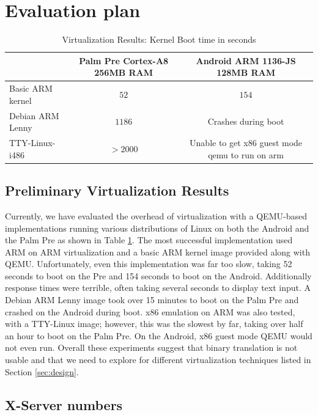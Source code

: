 \section{Evaluation plan}
\label{sec:eval}

\begin{table}[tbh]
\begin{tabular}{|l|c|c|}
\hline & Palm Pre Cortex-A8 256MB RAM & Android ARM 1136-JS 128MB RAM \\ 
\hline Basic ARM kernel & $52$ & $154$ \\ [2pt]
 Debian ARM Lenny & $1186$ & Crashes during boot \\ [2pt]
 TTY-Linux-i486 & $>2000$ & Unable to get x86 guest mode qemu to run on arm \\[2pt]
\hline 
\end{tabular}
\caption{
Virtualization Results: Kernel Boot time in seconds
}
\label{tab:virt_results}
\end{table}

\subsection{Preliminary Virtualization Results}

Currently, we have evaluated the overhead of virtualization with a QEMU-based implementations running various distributions of Linux on both the Android and the Palm Pre as shown in Table \ref{tab:virt_results}. The most successful implementation used ARM on ARM virtualization and a basic ARM kernel image provided along with QEMU. Unfortunately, even this implementation was far too slow, taking 52 seconds to boot on the Pre and 154 seconds to boot on the Android. Additionally response times were terrible, often taking several seconds to display text input. A Debian ARM Lenny image took over 15 minutes to boot on the Palm Pre and crashed on the Android during boot. x86 emulation on ARM was also tested, with a TTY-Linux image; however, this was the slowest by far, taking over half an hour to boot on the Palm Pre. On the Android, x86 guest mode QEMU would not even run. Overall these experiments suggest that binary translation is not usable and that we need to explore for different virtualization techniques listed in Section \ref{sec:design}.

\subsection{X-Server numbers}

